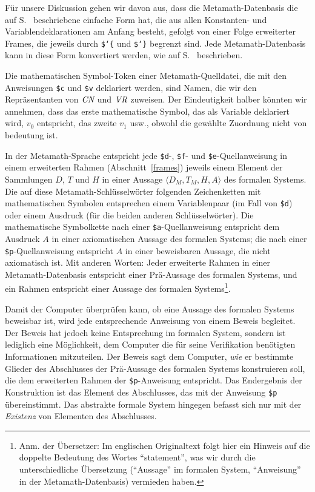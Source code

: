 Für unsere Diskussion gehen wir davon aus, dass die Metamath-Datenbasis die auf S.~\pageref{framelist} beschriebene einfache Form hat, die aus allen Konstanten- und Variablendeklarationen am Anfang besteht, gefolgt von einer Folge erweiterter Frames, die jeweils durch \texttt{\$\char`\{} und \texttt{\$\char`\}} begrenzt sind.  Jede Metamath-Datenbasis kann in diese Form konvertiert werden, wie auf S.~\pageref{frameconvert} beschrieben.

Die mathematischen Symbol-Token einer Metamath-Quelldatei, die mit den Anweisungen \texttt{\$c} und \texttt{\$v} deklariert werden, sind Namen, die wir den Repräsentanten von $\mbox{\em CN}$ und $\mbox{\em VR}$ zuweisen.  Der Eindeutigkeit halber könnten wir annehmen, dass das erste mathematische Symbol, das als Variable deklariert wird, $v_0$ entspricht, das zweite $v_1$ usw., obwohl die gewählte Zuordnung nicht von bedeutung ist.

In der Metamath-Sprache entspricht jede \texttt{\$d}-, \texttt{\$f}- und \texttt{\$e}-Quellanweisung in einem erweiterten Rahmen (Abschnitt~\ref{frames}) jeweils einem Element der Sammlungen $D$, $T$ und $H$ in einer Aussage  $\langle D_M,T_M,H,A\rangle$ des formalen Systems.  Die auf diese Metamath-Schlüsselwörter folgenden Zeichenketten mit mathematischen Symbolen entsprechen einem Variablenpaar (im Fall von \texttt{\$d}) oder einem Ausdruck (für die beiden anderen Schlüsselwörter). Die mathematische Symbolkette nach einer \texttt{\$a}-Quellanweisung entspricht dem Ausdruck $A$ in einer axiomatischen Aussage des formalen Systems; die nach einer \texttt{\$p}-Quellanweisung entspricht $A$ in einer beweisbaren Aussage, die nicht axiomatisch ist.  Mit anderen Worten: Jeder erweiterte Rahmen in einer Metamath-Datenbasis entspricht einer Prä-Aussage des formalen Systems, und ein Rahmen entspricht einer Aussage des formalen Systems\footnote{Anm. der Übersetzer: Im englischen Originaltext folgt hier ein Hinweis auf die doppelte Bedeutung des Wortes "`statement"', was wir durch die unterschiedliche Übersetzung ("`Aussage"' im formalen System, "`Anweisung"' in der Metamath-Datenbasis) vermieden haben.}.

Damit der Computer überprüfen kann, ob eine Aussage des formalen Systems beweisbar ist, wird jede entsprechende Anweisung von einem Beweis begleitet. Der Beweis hat jedoch keine Entsprechung im formalen System, sondern ist lediglich eine Möglichkeit, dem Computer die für seine Verifikation benötigten Informationen mitzuteilen.  Der Beweis sagt dem Computer, {\em wie} er bestimmte Glieder des Abschlusses der Prä-Aussage des formalen Systems konstruieren soll, die dem erweiterten Rahmen der \texttt{\$p}-Anweisung entspricht.  Das Endergebnis der Konstruktion ist das Element des Abschlusses, das mit der Anweisung \texttt{\$p} übereinstimmt.  Das abstrakte formale System hingegen befasst sich nur mit der {\em Existenz} von Elementen des Abschlusses.

